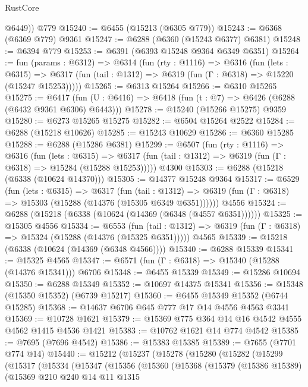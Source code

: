 \begin{lexlean}{RustCore}
\begin{coremodule}
        @6449))
    @779
@15240 := @6455 (@15213 (@6305 @779))
@15243 := @6368 (@6369 @779) @9361
@15247 := @6288 (@6360 (@15243 @6377) @6381)
@15248 := @6394 @779
@15253 := @6391 (@6393 @15248 @9364 @6349 @6351)
@15264 := fun (params : @6312) =>
  @6314
    (fun (rty : @1116) =>
    @6316
      (fun (lets : @6315) =>
      @6317 (fun (tail : @1312) => @6319 (fun (Γ : @6318) => @15220 (@15247 @15253)))))
@15265 := @6313 @15264
@15266 := @6310 @15265
@15275 := @6417 (fun (U : @6416) => @6418 (fun (t : @7) => @6426 (@6288 (@6432 @9361 @6306) @6443)))
@15278 := @15240 (@15266 @15275) @9359
@15280 := @6273 @15265 @15275
@15282 := @6504 @15264 @2522
@15284 := @6288 (@15218 @10626)
@15285 := @15243 @10629
@15286 := @6360 @15285
@15288 := @6288 (@15286 @6381)
@15299 := @6507
    (fun (rty : @1116) =>
    @6316
      (fun (lets : @6315) =>
      @6317 (fun (tail : @1312) => @6319 (fun (Γ : @6318) => @15284 (@15288 @15253)))))
    @4300
@15303 := @6288 (@15218 (@6338 (@10624 @14370)))
@15305 := @14377 @15248 @9364
@15317 := @6529
    (fun (lets : @6315) =>
    @6317
      (fun (tail : @1312) =>
      @6319 (fun (Γ : @6318) => @15303 (@15288 (@14376 (@15305 @6349 @6351))))))
    @4556
@15324 := @6288 (@15218 (@6338 (@10624 (@14369 (@6348 (@4557 @6351))))))
@15325 := @15305 @4556
@15334 := @6553
    (fun (tail : @1312) => @6319 (fun (Γ : @6318) => @15324 (@15288 (@14376 (@15325 @6351)))))
    @4565
@15339 := @15218 (@6338 (@10624 (@14369 (@6348 @4566))))
@15340 := @6288 @15339
@15341 := @15325 @4565
@15347 := @6571 (fun (Γ : @6318) => @15340 (@15288 (@14376 @15341))) @6706
@15348 := @6455 @15339
@15349 := @15286 @10694
@15350 := @6288 @15349
@15352 := @10697 @14375 @15341
@15356 := @15348 (@15350 @15352) (@6739 @15217)
@15360 := @6455 @15349 @15352 (@6744 @15285)
@15368 := @14637 @6706 @645 @777 @17 @14 @4556 @4563 @3341
@15369 := @10728 @1621
@15379 := @15369 @775 @364 @14 @16 @4542 @4555 @4562 @1415 @4536 @1421
@15383 := @10762 @1621 @14 @774 @4542
@15385 := @7695 (@7696 @4542)
@15386 := @15383 @15385
@15389 := @7655 (@7701 @774 @14)
@15440 := @15212
    (@15237
      (@15278
        (@15280
          (@15282
            (@15299
              (@15317
                (@15334
                  (@15347
                    (@15356
                      (@15360
                        (@15368
                          (@15379
                            (@15386 @15389)
                            (@15369
                              @210
                              @240
                              @14
                              @11
                              @1315

\end{coremodule}
\end{lexlean}

